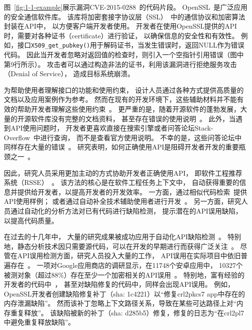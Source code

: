 图~\ref{fig:1-1-example}展示漏洞CVE-2015-0288~\cite{CVE-2015-0288}的代码片段。
OpenSSL~\cite{openssl}是广泛应用的安全通信软件库。
该库将加密套接字协议层（SSL）~\cite{ssl}中的通信协议和加密算法封装在API中，
以方便客户端开发者使用。
开发者在使用OpenSSL提供的API时，需要对各种证书（certificate）进行验证，
以确保信息的安全性和有效性。
例如，接口\texttt{X509\_get\_pubkey()}用于解码证书，当发生错误时，返回NULL作为错误代码。
因此当开发者忽略对返回值的检查时，则引入一个空指针引用错误（图中第9行所示）。
攻击者可以通过构造非法的证书，利用该漏洞进行拒绝服务攻击（Denial of Service），
造成目标系统崩溃。







为帮助使用者理解接口的功能和使用约束，
设计人员通过各种方式提供高质量的文档以及应用案例作为参考。
然而在现有的开发环境下，这些辅助材料并不能有效的帮助开发者理解这些使用约束~\cite{09-icse-doc}。
更严重的是，随着开源软件的蓬勃发展，大量的开源软件库没有完整的文档资料，
甚至存在错误的使用说明~\cite{15-ieee-doc-fail, 17-icse-api-doc}。
此外，当遇到API使用问题时，
开发者更喜欢直接在搜索引擎或者问答论坛Stack-Overflow~\cite{stackoverflow}中进行查询，
而不是查看官方使用说明。
不幸的是，这些问答论坛中同样存在大量的错误~\cite{16-sp-stack}。
研究表明，如何正确使用API是阻碍开发者开发的重要瓶颈之一~\cite{16-icse-cry}。


因此，研究人员采用更加主动的方式协助开发者正确使用API，
即软件工程推荐系统（RSSE）~\cite{10-ieee-rsse}。
该方法的核心是在软件工程任务上下文中，
自动获得重要的信息并提供给开发者，以提高开发者的开发效率。
一方面，通过相似代码检索~\cite{05-icse-rec,16-icse-doc-stack,14-msr-stack}提供API使用样例；
或者通过自动补全技术辅助使用者进行开发~\cite{15-tosem-code-cplt}。
另一方面，研究人员通过自动化的分析方法对已有代码进行缺陷检测，
提示潜在的API误用缺陷，以提高代码质量。


在过去的十几年中，
大量的研究成果被成功应用于自动化API缺陷检测~\cite{15-coufless-static-survey,18-icse-saful,survey18}。
特别地，静态分析技术因只需要源代码，可以在开发的早期进行而获得广泛关注~\cite{05-icse-static}。
尽管在API误用检测方面，研究人员投入大量的工作，
API误用在实际项目中依旧普遍存在~\cite{16-ase-spec, 18-icse-stack}。
一项对Google应用商店的调研显示，在11748个安卓应用中，
10327个被测对象（超过88\%）存在至少一个加密相关的API误用~\cite{13-ccs-misuse}。
特别地，富有经验的开发者的代码中~\cite{18-soups-api-blind}，
甚至对缺陷修复的代码中，同样会出现API误用。
例如，OpenSSL开发者创建缺陷修复补丁（sha: 1c4221）以``修复crl2pkcs7 app中存在的内存泄漏缺陷''。
然而该补丁忽略上下文路径关系，导致在某些可达路径上对``内存重复释放''。
该缺陷被新的补丁（sha: d285b5）修复，修复的日志为``在crl2pl7中避免重复释放缺陷''。


